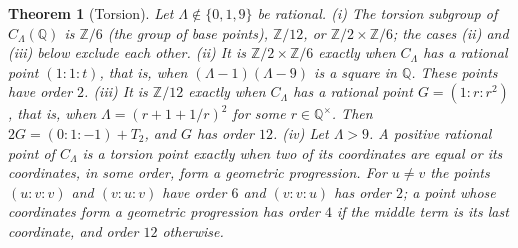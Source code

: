 \documentclass[11pt]{amsart}
\newtheorem{theorem}{Theorem}[section]
\theoremstyle{definition}
\theoremstyle{remark}
\newcommand{\Q}{\mathbb{Q}}
\newcommand{\Z}{\mathbb{Z}}
\begin{document}
\begin{theorem}[Torsion]\label{thm:torsion}
Let $\Lambda\notin\{0,1,9\}$ be rational.
\textup{(i)} The torsion subgroup of $C_\Lambda(\Q)$ is $\Z/6$ (the group of base points), $\Z/12$, or $\Z/2\times\Z/6$; the cases \textup{(ii)} and \textup{(iii)} below exclude each other.
\textup{(ii)} It is $\Z/2\times\Z/6$ exactly when $C_\Lambda$ has a rational point $(1:1:t)$, that is, when $(\Lambda-1)(\Lambda-9)$ is a square in $\Q$. These points have order $2$.
\textup{(iii)} It is $\Z/12$ exactly when $C_\Lambda$ has a rational point $G=(1:r:r^2)$, that is, when $\Lambda=(r+1+1/r)^2$ for some $r\in\Q^\times$. Then $2G=(0:1:-1)+T_2$, and $G$ has order $12$.
\textup{(iv)} Let $\Lambda>9$. A positive rational point of $C_\Lambda$ is a torsion point exactly when two of its coordinates are equal or its coordinates, in some order, form a geometric progression. For $u\ne v$ the points $(u:v:v)$ and $(v:u:v)$ have order $6$ and $(v:v:u)$ has order $2$; a point whose coordinates form a geometric progression has order $4$ if the middle term is its last coordinate, and order $12$ otherwise.
\end{theorem}
\end{document}
